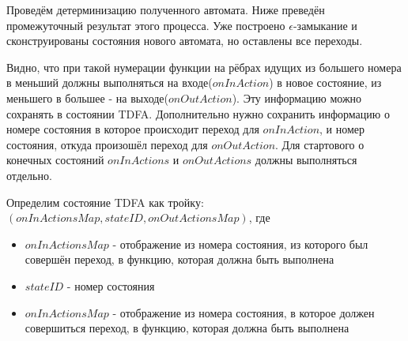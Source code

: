 \documentclass{article}
\begin{document}
\clearpage

Проведём детерминизацию полученного автомата. Ниже преведён промежуточный результат этого процесса. Уже построено $\epsilon$-замыкание и сконструированы состояния нового автомата, но оставлены все переходы.
  \begin{flushleft}
        
  \end{flushleft}

Видно, что при такой нумерации функции на рёбрах идущих из большего номера в меньший должны выполняться на входе($onInAction$) в новое состояние, из меньшего в большее - на выходе($onOutAction$). Эту информацию можно сохранять в состоянии TDFA. Дополнительно нужно сохранить информацию о номере состояния в которое происходит переход для $onInAction$, и номер состояния, откуда произошёл переход для $onOutAction$. Для стартового о конечных состояний $onInActions$ и $onOutActions$ должны выполняться отдельно.

Определим состояние TDFA как тройку: $(onInActionsMap, stateID, onOutActionsMap)$, где 
  \begin{itemize}
    \item
      $onInActionsMap$ - отображение из номера состояния, из которого был совершён переход, в функцию, которая должна быть выполнена
    \item
      $stateID$ - номер состояния
    \item
      $onInActionsMap$ - отображение из номера состояния, в которое должен совершиться переход, в функцию, которая должна быть выполнена

  \end{itemize}


  \begin{flushleft}
        
  \end{flushleft}
\end{document}
